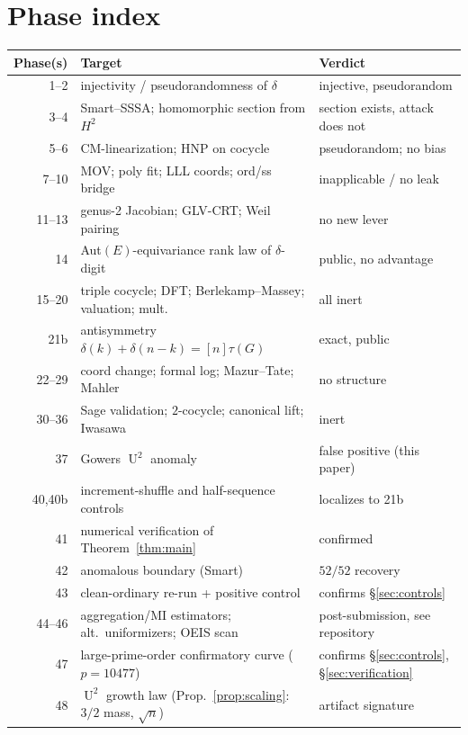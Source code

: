 \documentclass[11pt]{article}
\theoremstyle{definition}
\DeclareMathOperator{\Uk}{U}
\begin{document}
\appendix
\section{Phase index}\label{app:phases}

\begin{table}[H]
\centering
\small
\begin{tabular}{rll}
\toprule
Phase(s) & Target & Verdict\\
\midrule
1--2   & injectivity / pseudorandomness of $\delta$ & injective, pseudorandom\\
3--4   & Smart--SSSA; homomorphic section from $H^2$ & section exists, attack does not\\
5--6   & CM-linearization; HNP on cocycle & pseudorandom; no bias\\
7--10  & MOV; poly fit; LLL coords; ord/ss bridge & inapplicable / no leak\\
11--13 & genus-2 Jacobian; GLV-CRT; Weil pairing & no new lever\\
14     & Aut$(E)$-equivariance rank law of $\delta$-digit & public, no advantage\\
15--20 & triple cocycle; DFT; Berlekamp--Massey; valuation; mult. & all inert\\
21b    & antisymmetry $\delta(k)+\delta(n-k)=[n]\tau(G)$ & exact, public\\
22--29 & coord change; formal log; Mazur--Tate; Mahler & no structure\\
30--36 & Sage validation; $2$-cocycle; canonical lift; Iwasawa & inert\\
37     & Gowers $\Uk^2$ anomaly & false positive (this paper)\\
40,40b & increment-shuffle and half-sequence controls & localizes to 21b\\
41     & numerical verification of Theorem~\ref{thm:main} & confirmed\\
42     & anomalous boundary (Smart) & $52/52$ recovery\\
43     & clean-ordinary re-run + positive control & confirms \S\ref{sec:controls}\\
44--46 & aggregation/MI estimators; alt.\ uniformizers; OEIS scan & post-submission, see repository\\
47     & large-prime-order confirmatory curve ($p=10477$) & confirms \S\ref{sec:controls}, \S\ref{sec:verification}\\
48     & $\Uk^2$ growth law (Prop.~\ref{prop:scaling}: $3/2$ mass, $\sqrt n$) & artifact signature\\

\end{tabular}
\end{table}
\end{document}
